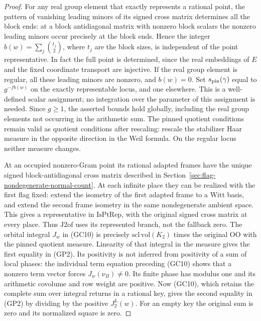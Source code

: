 \begin{proof}
For any real group element that exactly represents a rational
point, the pattern of vanishing leading minors of its signed
cross matrix determines all the block ends: at a block
antidiagonal matrix with nonzero block scalars the nonzero
leading minors occur precisely at the block ends. Hence the
integer \(b(w)=\sum_j \binom{t_j}{2}\), where \(t_j\) are
the block sizes, is independent of the point representative.
In fact the full point is determined, since the real embeddings
of \(E\) and the fixed coordinate transport are injective.
If the real group element is regular, all these leading minors
are nonzero, and \(b(w)=0\). Set \(s_{\rm pin}(\gamma)\)
equal to \(g^{-fb(w)}\) on the exactly representable locus,
and one elsewhere. This is a well-defined scalar assignment;
no integration over the parameter of this assignment is needed.
Since \(g\ge1\), the asserted bounds hold globally, including
the real group elements not occurring in the arithmetic sum.
The pinned quotient conditions remain valid as quotient
conditions after rescaling: rescale the stabilizer Haar measure
in the opposite direction in the Weil formula. On the regular
locus neither measure changes.

At an occupied nonzero-Gram point its rational adapted frames
have the unique signed block-antidiagonal cross matrix described
in Section~\ref{sec:flag-nondegenerate-normal-count}. At each
infinite place they can be realized with the first flag fixed:
extend the isometry of the first adapted frame to a Witt
basis, and extend the second frame isometry in the same
nondegenerate ambient space. This gives a representative in
\(\mathrm{IsPtRep}\), with the original signed cross matrix
at every place. Thus \(\mathrm{J2of}\) uses its represented
branch, not the fallback zero. The orbital integral \(J_w\)
in (GC10) is precisely
\(\mathrm{scl}\,\mathrm{vol}(K_2)\) times the original
\(\mathrm{OO}\) with the pinned quotient measure. Linearity
of that integral in the measure gives the first equality
in (GP2). Its positivity is not inferred from positivity
of a sum of local phases: the individual term equation
preceding (GC10) shows that a nonzero term vector forces
\(J_w(\nu_B)\ne0\). Its finite phase has modulus one and
its arithmetic covolume and row weight are positive.
Now (GC10), which retains the complete sum over integral
returns in a rational key, gives the second equality in
(GP2) by dividing by the positive \(J_2^L(w)\).
For an empty key the original sum is zero and its
normalized square is zero.
\end{proof}


